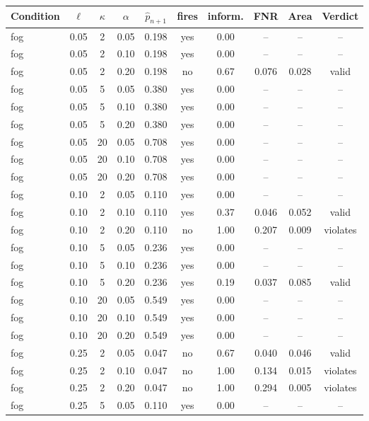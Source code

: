 \begin{table}[t]
\centering
\footnotesize
\setlength{\tabcolsep}{3pt}
\begin{tabular}{lccccccccc}
\toprule
Condition & $\ell$ & $\kappa$ & $\alpha$ & $\hat{p}_{n+1}$ & fires & inform. & FNR & Area & Verdict \\
\midrule
fog & 0.05 & 2 & 0.05 & 0.198 & yes & 0.00 & -- & -- & -- \\
fog & 0.05 & 2 & 0.10 & 0.198 & yes & 0.00 & -- & -- & -- \\
fog & 0.05 & 2 & 0.20 & 0.198 & no & 0.67 & 0.076 & 0.028 & valid \\
fog & 0.05 & 5 & 0.05 & 0.380 & yes & 0.00 & -- & -- & -- \\
fog & 0.05 & 5 & 0.10 & 0.380 & yes & 0.00 & -- & -- & -- \\
fog & 0.05 & 5 & 0.20 & 0.380 & yes & 0.00 & -- & -- & -- \\
fog & 0.05 & 20 & 0.05 & 0.708 & yes & 0.00 & -- & -- & -- \\
fog & 0.05 & 20 & 0.10 & 0.708 & yes & 0.00 & -- & -- & -- \\
fog & 0.05 & 20 & 0.20 & 0.708 & yes & 0.00 & -- & -- & -- \\
fog & 0.10 & 2 & 0.05 & 0.110 & yes & 0.00 & -- & -- & -- \\
fog & 0.10 & 2 & 0.10 & 0.110 & yes & 0.37 & 0.046 & 0.052 & valid \\
fog & 0.10 & 2 & 0.20 & 0.110 & no & 1.00 & 0.207 & 0.009 & violates \\
fog & 0.10 & 5 & 0.05 & 0.236 & yes & 0.00 & -- & -- & -- \\
fog & 0.10 & 5 & 0.10 & 0.236 & yes & 0.00 & -- & -- & -- \\
fog & 0.10 & 5 & 0.20 & 0.236 & yes & 0.19 & 0.037 & 0.085 & valid \\
fog & 0.10 & 20 & 0.05 & 0.549 & yes & 0.00 & -- & -- & -- \\
fog & 0.10 & 20 & 0.10 & 0.549 & yes & 0.00 & -- & -- & -- \\
fog & 0.10 & 20 & 0.20 & 0.549 & yes & 0.00 & -- & -- & -- \\
fog & 0.25 & 2 & 0.05 & 0.047 & no & 0.67 & 0.040 & 0.046 & valid \\
fog & 0.25 & 2 & 0.10 & 0.047 & no & 1.00 & 0.134 & 0.015 & violates \\
fog & 0.25 & 2 & 0.20 & 0.047 & no & 1.00 & 0.294 & 0.005 & violates \\
fog & 0.25 & 5 & 0.05 & 0.110 & yes & 0.00 & -- & -- & -- \\

\end{tabular}
\end{table}
